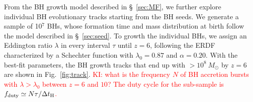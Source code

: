 \documentclass[twocolumn, twocolappendix]{aastex63}
\newcommand{\Msun}{M_\odot}
\newcommand{\tlife}{\tau}
\newcommand{\fseed}{f_\mathrm{seed}}
\newcommand{\red}[1]{\textcolor{red}{ #1}}
\newcommand{\blue}[1]{\textcolor{blue}{ #1}}
\begin{document}
\begin{CJK*}{UTF8}{gbsn}
From the BH growth model described in \S~\ref{sec:MF}, we further explore individual BH evolutionary tracks starting from the BH seeds.
We generate a sample of 10$^7$ BHs, whose formation time and mass distribution at birth follow the model described in \S~\ref{sec:seed}. 
To growth the individual BHs, we assign an Eddington ratio $\lambda$ in every interval $\tlife$ until $z=6$,
following the ERDF characterized by a Schechter function with $\lambda_0=0.87$ and $\alpha=0.20$.
With the best-fit parameters, the BH growth tracks that end up with $>10^8~\Msun$ by $z=6$ are shown in Fig.~\ref{fig:track}. 
\red{KI: what is the frequency $N$ of BH accretion bursts with $\lambda>\lambda_0$ between $z=6$ and $10$? The duty cycle for the sub-sample
is $f_{\rm duty}\simeq N\tlife/\Delta t_{\rm H}$.}



\end{CJK*}
\end{document}
